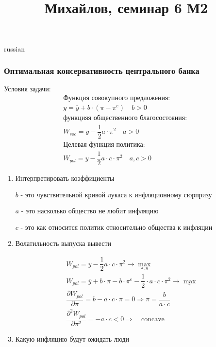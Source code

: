 \documentclass{article}
\begin{document}
\title{\foreignlanguage{russian}{Михайлов, семинар 6 М2}}
\maketitle
\begin{otherlanguage*}{russian}
\subsubsection*{Оптимальная консервативность центрального банка}
Условия задачи:
\begin{align*}
\text{Функция совокупного предложения: } \\
y = \bar{y	} + b \cdot (\pi - \pi^e) \quad b > 0 \\
\text{функцияя общественного благосостояния: } \\
W_{soc} = y - \dfrac{1}{2} a \cdot \pi^2  \quad a > 0 \\
\text{Целевая функция политика: } \\
W_{pol} = y -  \dfrac{1}{2} a \cdot c \cdot \pi^ 2 \quad a, c > 0 
\end{align*}
\begin{enumerate}

\item Интерпретировать коэффициенты

$b$ - это чувствительной кривой лукаса к инфляционному сюрпризу

$a$ - это насколько общество не любит инфляцию

$c$ - это как относится политик относительно общества к инфляции

\item Волатильность выпуска вывести

\begin{align*}
W_{pol} = y - \dfrac{1}{2} a \cdot c \cdot \pi^ 2 \rightarrow \max_{\pi, y} \\
W_{pol} = \bar{y} + b \cdot \pi - b \cdot \pi^e - \dfrac{1}{2} \cdot a \cdot c \cdot \pi^2 \rightarrow \max_{\pi} \\
\dfrac{\partial W_{pol}}{\partial \pi} = b - a \cdot c \cdot \pi = 0 \Rightarrow \pi  = \dfrac{b}{a \cdot c} \\
\dfrac{\partial^2 W_{pol}}{\partial \pi^2} = - a \cdot c < 0 \Rightarrow \quad \text{concave} 
\end{align*}
\item Какую инфляцию будут ожидать люди


\end{enumerate}
\end{otherlanguage*}
\end{document}
